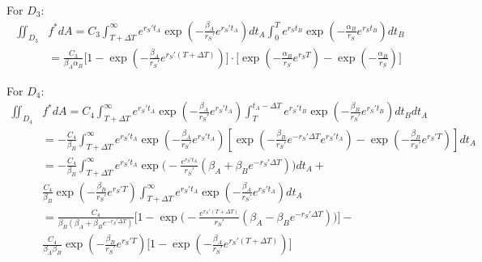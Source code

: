 \documentclass{article}
\begin{document}
For $D_3$:
\begin{equation}
\begin{split}
\iint_{D_3} & f^* dA = C_3 \int_{T+\Delta T}^{\infty} e^{r_S' t_A} \exp(-\frac{\beta_A}{r_S'} e^{r_S' t_A})dt_A \int_0^T e^{r_S t_B} \exp(-\frac{\alpha_B}{r_S} e^{r_S t_B}) dt_B\\
&= \frac{C_3}{\beta_A \alpha_B} \Big[1-\exp(-\frac{\beta_A}{r_S'} e^{r_S' (T+\Delta T)})\Big]\cdot \Big[\exp(-\frac{\alpha_B}{r_S} e^{r_S T}) - \exp(-\frac{\alpha_B}{r_S})\Big]
\end{split}
\end{equation}

For $D_4$:
\begin{equation}
\begin{split}
\iint_{D_4} & f^* dA = C_4 \int_{T+\Delta T}^{\infty} e^{r_S' t_A} \exp(-\frac{\beta_A}{r_S'} e^{r_S' t_A})\int_T^{t_A-\Delta T} e^{r_S' t_B} \exp(-\frac{\beta_B}{r_S'} e^{r_S' t_B}) dt_B dt_A \\
& = -\frac{C_4}{\beta_B} \int_{T+\Delta T}^{\infty} e^{r_S' t_A} \exp(-\frac{\beta_A}{r_S'} e^{r_S' t_A}) [\exp(-\frac{\beta_B}{r_S'} e^{-r_S' \Delta T} e^{r_S' t_A }) - \exp(-\frac{\beta_B}{r_S'} e^{r_S' T})] dt_A \\
& = -\frac{C_4}{\beta_B} \int_{T+\Delta T}^{\infty} e^{r_S' t_A} \exp\Big(-\frac{e^{r_S' t_A}}{r_S'} (\beta_A+\beta_B e^{-r_S' \Delta T}) \Big) dt_A + \\
& \frac{C_4}{\beta_B} \exp(-\frac{\beta_B}{r_S'} e^{r_S' T}) \int_{T+\Delta T}^{\infty} e^{r_S' t_A} \exp(-\frac{\beta_A}{r_S'} e^{r_S' t_A}) dt_A\\
& = \frac{C_4}{\beta_B(\beta_A + \beta_B e^{-r_S' \Delta T})}\Big[1 - \exp\Big(-\frac{e^{r_S' (T+\Delta T)}}{r_S'} (\beta_A - \beta_B e^{-r_S' \Delta T}) \Big)\Big]- \\
& \frac{C_4}{\beta_A \beta_B} \exp(-\frac{\beta_B}{r_S'} e^{r_S' T}) \Big[1 - \exp(-\frac{\beta_A}{r_S'} e^{r_S' (T+\Delta T)})\Big]
\end{split}
\end{equation}
\end{document}
